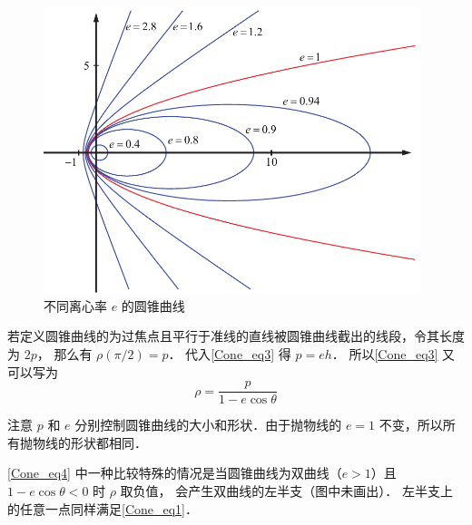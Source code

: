 \begin{figure}[ht]
\centering
\includegraphics[width=11cm]{./figures/Cone2.pdf}
\caption{不同离心率 $e$ 的圆锥曲线} \label{Cone_fig2}
\end{figure}
若定义圆锥曲线的为过焦点且平行于准线的直线被圆锥曲线截出的线段，令其长度为 $2p$， 那么有 $\rho (\pi /2) = p$． 代入\autoref{Cone_eq3} 得 $p = eh$． 所以\autoref{Cone_eq3} 又可以写为
\begin{equation}\label{Cone_eq4}
\rho  = \frac{p}{1 - e\cos \theta }
\end{equation}


注意 $p$ 和 $e$ 分别控制圆锥曲线的大小和形状．由于抛物线的 $e = 1$ 不变，所以所有抛物线的形状都相同．

\autoref{Cone_eq4} 中一种比较特殊的情况是当圆锥曲线为双曲线（$e > 1$）且 $1- e\cos\theta < 0$ 时 $\rho$ 取负值， 会产生双曲线的左半支（图中未画出）． 左半支上的任意一点同样满足\autoref{Cone_eq1}．



